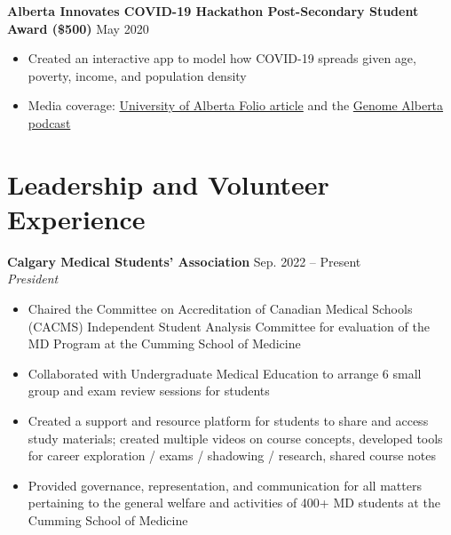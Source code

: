 \documentclass{article}
\begin{document}
\textbf{Alberta Innovates COVID-19 Hackathon Post-Secondary Student Award (\$500)} \hfill May 2020
\begin{itemize}
    \item Created an interactive app to model how COVID-19 spreads given age, poverty, income, and population density
    \item Media coverage: \href{https://www.folio.ca/students-develop-online-tool-to-predict-covid-19-spread-based-on-demographics/}{University of Alberta Folio article} and the \href{https://genomealberta.ca/genomics/genomics_blog_08182001.aspx}{Genome Alberta podcast}
\end{itemize}


\section*{\textcolor{my_colour}{Leadership and Volunteer Experience}}
\vspace{-.25em} \hrulefill \vspace{.25em}

\textbf{Calgary Medical Students' Association} \hfill Sep. 2022 -- Present \\
\textit{President}
\begin{itemize}
    \item Chaired the Committee on Accreditation of Canadian Medical Schools (CACMS) Independent Student Analysis Committee for evaluation of the MD Program at the Cumming School of Medicine
    \item Collaborated with Undergraduate Medical Education to arrange 6 small group and exam review sessions for students
    \item Created a support and resource platform for students to share and access study materials; created multiple videos on course concepts, developed tools for career exploration / exams / shadowing / research, shared course notes
    \item Provided  governance, representation, and communication for all matters pertaining to the general welfare and activities of 400+ MD students at the Cumming School of Medicine
\end{itemize} \vspace{1em}
\end{document}
